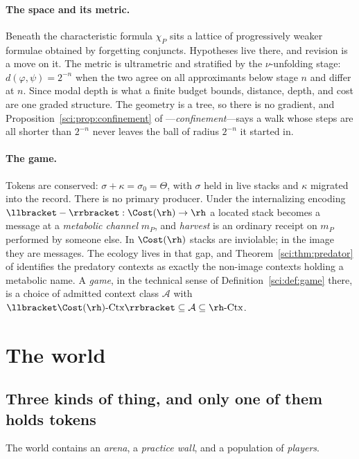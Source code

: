\paragraph{The space and its metric.} Beneath the characteristic formula
$\chi_P$ sits a lattice of progressively weaker formulae obtained by forgetting
conjuncts. Hypotheses live there, and revision is a move on it. The metric is
ultrametric and stratified by the $\nu$-unfolding stage: $d(\varphi,\psi) =
2^{-n}$ when the two agree on all approximants below stage $n$ and differ at
$n$. Since modal depth is what a finite budget bounds, distance, depth, and cost
are one graded structure. The geometry is a tree, so there is no gradient, and
Proposition~\ref{sci:prop:confinement} of \chSci---\emph{confinement}---says a walk whose
steps are all shorter than $2^{-n}$ never leaves the ball of radius $2^{-n}$ it
started in.

\paragraph{The game.} Tokens are conserved: $\sigma + \kappa = \sigma_0 =
\Theta$, with $\sigma$ held in live stacks and $\kappa$ migrated into the
record. There is no primary producer. Under the internalizing encoding
$\llbracket -\rrbracket : \Cost(\rh) \to \rh$ a located stack becomes a message
at a \emph{metabolic channel} $m_P$, and \emph{harvest} is an ordinary receipt
on $m_P$ performed by someone else. In $\Cost(\rh)$ stacks are inviolable; in
the image they are messages. The ecology lives in that gap, and Theorem~\ref{sci:thm:predator} of
\chSci identifies the predatory contexts as exactly the non-image
contexts holding a metabolic name. A \emph{game}, in the technical sense of
Definition~\ref{sci:def:game} there, is a choice of admitted context class $\mathcal{A}$ with
$\llbracket \Cost(\rh)\text{-Ctx}\rrbracket \subseteq \mathcal{A} \subseteq
\rh\text{-Ctx}$.

\section{The world}\label{gam:sec:world}\label{gam:S3}

\subsection{Three kinds of thing, and only one of them holds tokens}\label{gam:S3.1}

The world contains an \emph{arena}, a \emph{practice wall}, and a population of
\emph{players}.

